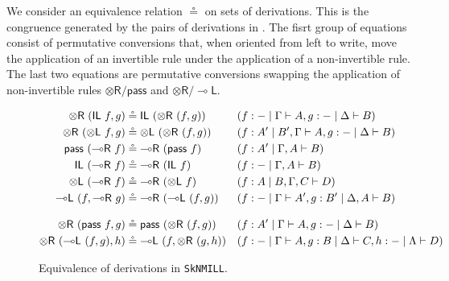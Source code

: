 \documentclass[runningheads]{llncs}
\newcommand{\tl}{\otimes \mathsf{L}}
\newcommand{\tr}{\otimes \mathsf{R}}
\newcommand{\lright}{{\multimap}\mathsf{R}}
\newcommand{\lleft}{{\multimap}\mathsf{L}}
\newcommand{\pass}{\mathsf{pass}}
\newcommand{\unitl}{\mathsf{IL}}
\newcommand{\unitr}{\mathsf{IR}}
\newcommand{\otR}{\tr}
\newcommand{\lolliR}{\lright}
\newcommand{\lolliL}{\lleft}
\newcommand{\ax}{\mathsf{ax}}
\newcommand{\ot}{\otimes}
\newcommand{\lolli}{\multimap}
\newcommand{\I}{\mathsf{I}}
\newcommand{\SkNMILL}{\texttt{SkNMILL}}
\begin{document}
We consider an equivalence relation $\circeq$ on sets of derivations. This is the congruence generated by the pairs of derivations in . The fisrt group of equations consist of permutative conversions that, when oriented from left to write, move the application of an invertible rule under the application of a non-invertible rule. The last two equations are permutative conversions swapping the application of non-invertible rules $\otR/\pass$ and $\otR/\lolliL$.
\begin{figure}[t]
\begin{align*}\small
  \tr \text{ } (\unitl \text{ } f, g) &\circeq \unitl \text{ } (\tr \text{ } (f , g)) &&(f : - \mid \Gamma \vdash A , g : - \mid \Delta \vdash B)
  \\
  \tr \text{ } (\tl \text{ } f, g) &\circeq \tl \text{ } (\tr \text{ } (f , g)) &&(f : A' \mid B' , \Gamma \vdash A , g : - \mid \Delta \vdash B)
  \\
  \pass \text{ } (\lolliR \text{ } f) &\circeq \lolliR \text{ } (\pass \text{ } f) &&(f : A' \mid \Gamma , A \vdash B)
  \\
  \unitl \text{ } (\lolliR \text{ } f) &\circeq \lolliR \text{ } (\unitl \text{ } f) &&(f : - \mid \Gamma , A \vdash B)
  \\
  \tl \text{ } (\lolliR \text{ } f) &\circeq \lolliR \text{ } (\tl \text{ } f) &&(f : A \mid B , \Gamma , C \vdash D)
  \\
  \lleft \text{ } (f, \lolliR \text{ } g) &\circeq \lolliR \text{ } (\lleft \text{ } (f, g)) &&(f : - \mid \Gamma \vdash A', g : B' \mid \Delta , A \vdash B)
  \\[9pt]
  \tr \text{ } (\pass \text{ } f, g) &\circeq \pass \text{ } (\tr \text{ } (f, g)) &&(f : A' \mid \Gamma \vdash A, g : - \mid \Delta \vdash B)
  \\
  \tr \text{ } (\lleft \text{ } (f , g), h) & \circeq \lleft \text{ } (f, \tr \text{ } (g, h)) &&(f: - \mid \Gamma \vdash A, g : B \mid \Delta \vdash C, h : - \mid \Lambda \vdash D)
\end{align*}
\caption{Equivalence of derivations in \SkNMILL.}
\label{fig:circeq}
\end{figure}
\end{document}
